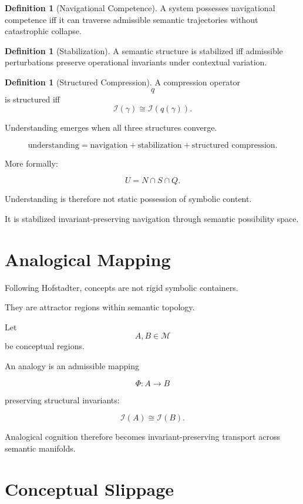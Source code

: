 \documentclass[12pt,openany]{book}
\theoremstyle{plain}
\theoremstyle{definition}
\newtheorem{definition}[theorem]{Definition}
\theoremstyle{remark}
\begin{document}
\begin{definition}[Navigational Competence]
A system possesses navigational competence iff it can traverse
admissible semantic trajectories without catastrophic collapse.
\end{definition}

\begin{definition}[Stabilization]
A semantic structure is stabilized iff admissible perturbations
preserve operational invariants under contextual variation.
\end{definition}

\begin{definition}[Structured Compression]
A compression operator
\[
q
\]
is structured iff
\[
\mathcal{I}(\gamma)
\cong
\mathcal{I}(q(\gamma)).
\]
\end{definition}

Understanding emerges when all three structures converge.

\[
\text{understanding}
=
\text{navigation}
+
\text{stabilization}
+
\text{structured compression}.
\]

More formally:

\[
U
=
N \cap S \cap Q.
\]

Understanding is therefore not static possession of symbolic
content.

It is stabilized invariant-preserving navigation through semantic
possibility space.

\section{Analogical Mapping}

Following Hofstadter, concepts are not rigid symbolic containers.

They are attractor regions within semantic topology.

Let
\[
A,B\in\mathcal{M}
\]
be conceptual regions.

An analogy is an admissible mapping

\[
\Phi : A \to B
\]

preserving structural invariants:

\[
\mathcal{I}(A)
\cong
\mathcal{I}(B).
\]

Analogical cognition therefore becomes invariant-preserving
transport across semantic manifolds.

\section{Conceptual Slippage}
\end{document}
